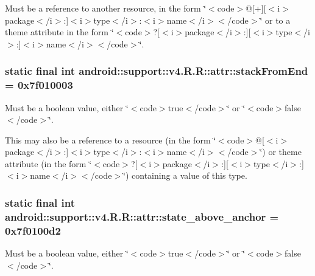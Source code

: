 Must be a reference to another resource, in the form \char`\"{}$<$code$>$@\mbox{[}+\mbox{]}\mbox{[}$<$i$>$package$<$/i$>$:\mbox{]}$<$i$>$type$<$/i$>$:$<$i$>$name$<$/i$>$$<$/code$>$\char`\"{} or to a theme attribute in the form \char`\"{}$<$code$>$?\mbox{[}$<$i$>$package$<$/i$>$:\mbox{]}\mbox{[}$<$i$>$type$<$/i$>$:\mbox{]}$<$i$>$name$<$/i$>$$<$/code$>$\char`\"{}. \hypertarget{classandroid_1_1support_1_1v4_1_1_r_1_1attr_e6e8293781b82279a7842ba84ffb8148}{
\subsubsection[{stackFromEnd}]{\setlength{\rightskip}{0pt plus 5cm}static final int android::support::v4.R.R::attr::stackFromEnd = 0x7f010003}}
\label{classandroid_1_1support_1_1v4_1_1_r_1_1attr_e6e8293781b82279a7842ba84ffb8148}


Must be a boolean value, either \char`\"{}$<$code$>$true$<$/code$>$\char`\"{} or \char`\"{}$<$code$>$false$<$/code$>$\char`\"{}. 

This may also be a reference to a resource (in the form \char`\"{}$<$code$>$@\mbox{[}$<$i$>$package$<$/i$>$:\mbox{]}$<$i$>$type$<$/i$>$:$<$i$>$name$<$/i$>$$<$/code$>$\char`\"{}) or theme attribute (in the form \char`\"{}$<$code$>$?\mbox{[}$<$i$>$package$<$/i$>$:\mbox{]}\mbox{[}$<$i$>$type$<$/i$>$:\mbox{]}$<$i$>$name$<$/i$>$$<$/code$>$\char`\"{}) containing a value of this type. \hypertarget{classandroid_1_1support_1_1v4_1_1_r_1_1attr_cd0919d4a89dad9dc9c9f35f0c5b8d00}{
\subsubsection[{state\_\-above\_\-anchor}]{\setlength{\rightskip}{0pt plus 5cm}static final int android::support::v4.R.R::attr::state\_\-above\_\-anchor = 0x7f0100d2}}
\label{classandroid_1_1support_1_1v4_1_1_r_1_1attr_cd0919d4a89dad9dc9c9f35f0c5b8d00}


Must be a boolean value, either \char`\"{}$<$code$>$true$<$/code$>$\char`\"{} or \char`\"{}$<$code$>$false$<$/code$>$\char`\"{}. 

